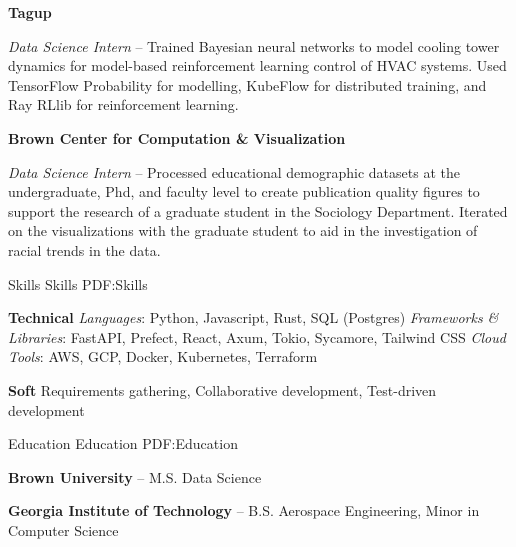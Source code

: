 \documentclass[letterpaper,MMMyyyy,nonstopmode]{simpleresumecv}
\begin{document}
\begin{Body}
\BigGap

\Entry \textbf{Tagup}

\Gap

\BulletItem \textit{Data Science Intern}
\hfill
{} -- 
\SubBulletItem
Trained Bayesian neural networks to model cooling tower dynamics for model-based reinforcement learning control of HVAC systems. Used TensorFlow Probability for modelling, KubeFlow for distributed training, and Ray RLlib for reinforcement learning.

\BigGap

\Entry \textbf{Brown Center for Computation \& Visualization}

\Gap
  
\BulletItem \textit{Data Science Intern}
\hfill
{} -- 
\SubBulletItem
Processed educational demographic datasets at the undergraduate, Phd, and faculty level to create publication quality figures to support the research of a graduate student in the Sociology Department. Iterated on the visualizations with the graduate student to aid in the investigation of racial trends in the data.



\Section
{Skills}
{Skills}
{PDF:Skills}

\Entry \textbf{Technical}
  \BulletItem \textit{Languages}: Python, Javascript, Rust, SQL (Postgres)
  \BulletItem \textit{Frameworks \& Libraries}: FastAPI, Prefect, React, Axum, Tokio, Sycamore, Tailwind CSS
  \BulletItem \textit{Cloud Tools}: AWS, GCP, Docker, Kubernetes, Terraform

\BigGap

\Entry \textbf{Soft}
\BulletItem Requirements gathering, Collaborative development, Test-driven development

\Section
{Education}
{Education}
{PDF:Education}

\Entry \textbf{Brown University}
\hfill
{} -- 
\BulletItem M.S. Data Science

\Entry \textbf{Georgia Institute of Technology}
\hfill
{} -- 
\BulletItem B.S. Aerospace Engineering, Minor in Computer Science


\end{Body}
\end{document}
